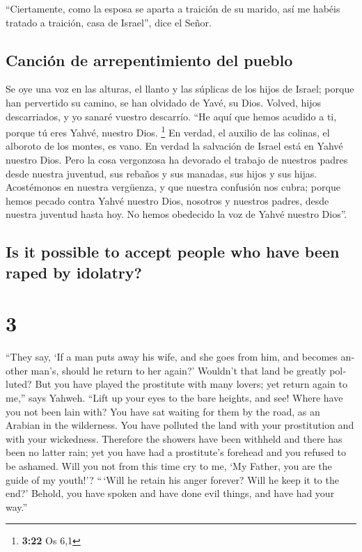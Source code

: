 \begin{paracol}{2}
 ``Ciertamente, como la esposa se aparta a traición de su
marido, así me habéis tratado a traición, casa de Israel'', dice el
Señor.

\hypertarget{canciuxf3n-de-arrepentimiento-del-pueblo}{%
\subsection{Canción de arrepentimiento del
pueblo}\label{canciuxf3n-de-arrepentimiento-del-pueblo}}

 Se oye una voz en las alturas, el llanto y las súplicas
de los hijos de Israel; porque han pervertido su camino, se han olvidado
de Yavé, su Dios.  Volved, hijos descarriados, y yo
sanaré vuestro descarrío. ``He aquí que hemos acudido a ti, porque tú
eres Yahvé, nuestro Dios. \footnote{\textbf{3:22} Os 6,1}
 En verdad, el auxilio de las colinas, el alboroto de los
montes, es vano. En verdad la salvación de Israel está en Yahvé nuestro
Dios.  Pero la cosa vergonzosa ha devorado el trabajo de
nuestros padres desde nuestra juventud, sus rebaños y sus manadas, sus
hijos y sus hijas.  Acostémonos en nuestra vergüenza, y
que nuestra confusión nos cubra; porque hemos pecado contra Yahvé
nuestro Dios, nosotros y nuestros padres, desde nuestra juventud hasta
hoy. No hemos obedecido la voz de Yahvé nuestro Dios''.

\switchcolumn
\begin{otherlanguage}{english}

\hypertarget{is-it-possible-to-accept-people-who-have-been-raped-by-idolatry}{%
\subsection{Is it possible to accept people who have been raped by
idolatry?}\label{is-it-possible-to-accept-people-who-have-been-raped-by-idolatry}}

\hypertarget{section-5}{%
\section{3}\label{section-5}}

 ``They say, `If a man puts away his wife, and she goes
from him, and becomes another man's, should he return to her again?'
Wouldn't that land be greatly polluted? But you have played the
prostitute with many lovers; yet return again to me,'' says Yahweh.
 ``Lift up your eyes to the bare heights, and see! Where
have you not been lain with? You have sat waiting for them by the road,
as an Arabian in the wilderness. You have polluted the land with your
prostitution and with your wickedness.  Therefore the
showers have been withheld and there has been no latter rain; yet you
have had a prostitute's forehead and you refused to be ashamed.
 Will you not from this time cry to me, `My Father, you
are the guide of my youth!'?  ``\,`Will he retain his
anger forever? Will he keep it to the end?' Behold, you have spoken and
have done evil things, and have had your way.''


\end{otherlanguage}
\end{paracol}
